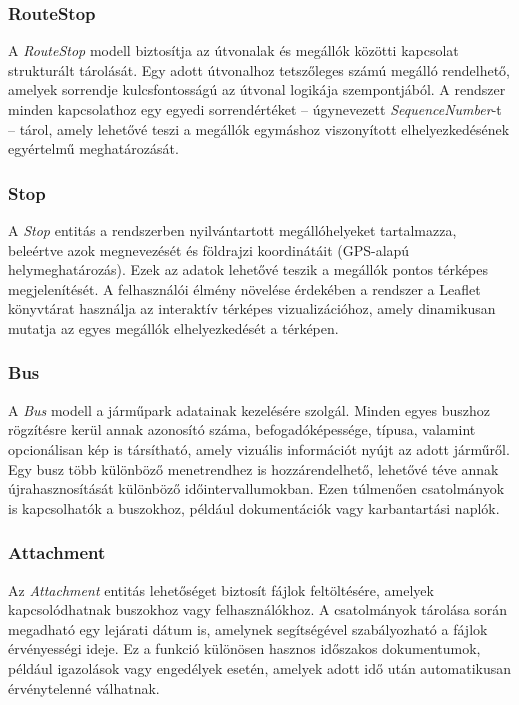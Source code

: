 \subsubsection{RouteStop}

A \textit{RouteStop} modell biztosítja az útvonalak és megállók közötti kapcsolat strukturált tárolását. Egy adott útvonalhoz tetszőleges számú megálló rendelhető, amelyek sorrendje kulcsfontosságú az útvonal logikája szempontjából. A rendszer minden kapcsolathoz egy egyedi sorrendértéket – úgynevezett \textit{SequenceNumber}-t – tárol, amely lehetővé teszi a megállók egymáshoz viszonyított elhelyezkedésének egyértelmű meghatározását.

\subsubsection{Stop}

A \textit{Stop} entitás a rendszerben nyilvántartott megállóhelyeket tartalmazza, beleértve azok megnevezését és földrajzi koordinátáit (GPS-alapú helymeghatározás). Ezek az adatok lehetővé teszik a megállók pontos térképes megjelenítését. A felhasználói élmény növelése érdekében a rendszer a Leaflet könyvtárat használja az interaktív térképes vizualizációhoz, amely dinamikusan mutatja az egyes megállók elhelyezkedését a térképen.

\subsubsection{Bus}

A \textit{Bus} modell a járműpark adatainak kezelésére szolgál. Minden egyes buszhoz rögzítésre kerül annak azonosító száma, befogadóképessége, típusa, valamint opcionálisan kép is társítható, amely vizuális információt nyújt az adott járműről. Egy busz több különböző menetrendhez is hozzárendelhető, lehetővé téve annak újrahasznosítását különböző időintervallumokban. Ezen túlmenően csatolmányok is kapcsolhatók a buszokhoz, például dokumentációk vagy karbantartási naplók.

\subsubsection{Attachment}

Az \textit{Attachment} entitás lehetőséget biztosít fájlok feltöltésére, amelyek kapcsolódhatnak buszokhoz vagy felhasználókhoz. A csatolmányok tárolása során megadható egy lejárati dátum is, amelynek segítségével szabályozható a fájlok érvényességi ideje. Ez a funkció különösen hasznos időszakos dokumentumok, például igazolások vagy engedélyek esetén, amelyek adott idő után automatikusan érvénytelenné válhatnak.

